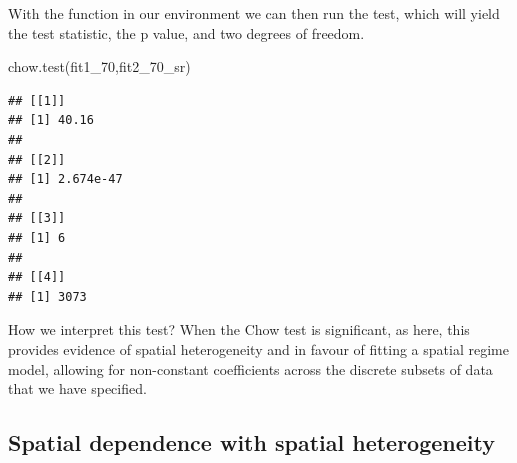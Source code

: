 \documentclass[
  krantz2]{krantz}
\makeatletter
\newenvironment{Shaded}{\begin{snugshade}}{\end{snugshade}}
\newcommand{\AttributeTok}[1]{\textcolor[rgb]{0.61,0.61,0.61}{#1}}
\newcommand{\ConstantTok}[1]{\textcolor[rgb]{0,0,0}{#1}}
\newcommand{\ControlFlowTok}[1]{\textcolor[rgb]{0.27,0.27,0.27}{\textbf{#1}}}
\newcommand{\DecValTok}[1]{\textcolor[rgb]{0.06,0.06,0.06}{#1}}
\newcommand{\FunctionTok}[1]{\textcolor[rgb]{0,0,0}{#1}}
\newcommand{\NormalTok}[1]{#1}
\newcommand{\OtherTok}[1]{\textcolor[rgb]{0.37,0.37,0.37}{#1}}
\newcommand{\SpecialCharTok}[1]{\textcolor[rgb]{0,0,0}{#1}}
\newenvironment{kframe}{%
\medskip{}
\setlength{\fboxsep}{.8em}
 \def\at@end@of@kframe{}%
 \ifinner\ifhmode%
  \def\at@end@of@kframe{\end{minipage}}%
  \begin{minipage}{\columnwidth}%
 \fi\fi%
 \def\FrameCommand##1{\hskip\@totalleftmargin \hskip-\fboxsep
 \colorbox{shadecolor}{##1}\hskip-\fboxsep
     \hskip-\linewidth \hskip-\@totalleftmargin \hskip\columnwidth}%
 \MakeFramed {\advance\hsize-\width
   \@totalleftmargin\z@ \linewidth\hsize
   \@setminipage}}%
 {\par\unskip\endMakeFramed%
 \at@end@of@kframe}
\renewenvironment{Shaded}{\begin{kframe}}{\end{kframe}}
\makeatother
\begin{document}
\begin{Shaded}
\end{Shaded}

With the function in our environment we can then run the test, which will yield the test statistic, the p value, and two degrees of freedom.

\begin{Shaded}
\begin{Highlighting}[]
 \FunctionTok{chow.test}\NormalTok{(fit1\_70,fit2\_70\_sr)}
\end{Highlighting}
\end{Shaded}

\begin{verbatim}
## [[1]]
## [1] 40.16
## 
## [[2]]
## [1] 2.674e-47
## 
## [[3]]
## [1] 6
## 
## [[4]]
## [1] 3073
\end{verbatim}

How we interpret this test? When the Chow test is significant, as here, this provides evidence of spatial heterogeneity and in favour of fitting a spatial regime model, allowing for non-constant coefficients across the discrete subsets of data that we have specified.

\hypertarget{spatial-dependence-with-spatial-heterogeneity}{%
\subsection{Spatial dependence with spatial heterogeneity}\label{spatial-dependence-with-spatial-heterogeneity}}
\end{document}
